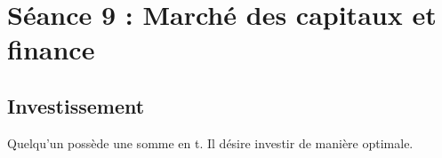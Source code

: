 \section{Séance 9 : Marché des capitaux et finance}




\subsection{Investissement}



Quelqu'un possède une somme en t. Il désire investir de manière optimale.
\begin{center}
	\begin{tabular}{|c|}
		\hline
		
		\hline
	\end{tabular}
\end{center}

